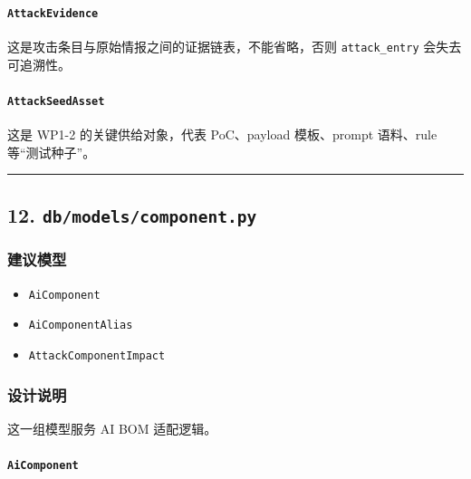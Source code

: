 \documentclass[UTF8]{ctexart}
\providecommand{\tightlist}{%
  \setlength{\itemsep}{0pt}\setlength{\parskip}{0pt}}
\begin{document}
\hypertarget{attackevidence}{%
\paragraph{\texorpdfstring{\texttt{AttackEvidence}}{AttackEvidence}}\label{attackevidence}}

这是攻击条目与原始情报之间的证据链表，不能省略，否则
\texttt{attack\_entry} 会失去可追溯性。

\hypertarget{attackseedasset}{%
\paragraph{\texorpdfstring{\texttt{AttackSeedAsset}}{AttackSeedAsset}}\label{attackseedasset}}

这是 WP1-2 的关键供给对象，代表 PoC、payload 模板、prompt 语料、rule
等``测试种子''。

\begin{center}\rule{0.5\linewidth}{0.5pt}\end{center}

\hypertarget{dbmodelscomponent.py}{%
\subsection{\texorpdfstring{12.
\texttt{db/models/component.py}}{12. db/models/component.py}}\label{dbmodelscomponent.py}}

\hypertarget{ux5efaux8baeux6a21ux578b-2}{%
\subsubsection{建议模型}\label{ux5efaux8baeux6a21ux578b-2}}

\begin{itemize}
\tightlist
\item
  \texttt{AiComponent}
\item
  \texttt{AiComponentAlias}
\item
  \texttt{AttackComponentImpact}
\end{itemize}

\hypertarget{ux8bbeux8ba1ux8bf4ux660e-1}{%
\subsubsection{设计说明}\label{ux8bbeux8ba1ux8bf4ux660e-1}}

这一组模型服务 AI BOM 适配逻辑。

\hypertarget{aicomponent}{%
\paragraph{\texorpdfstring{\texttt{AiComponent}}{AiComponent}}\label{aicomponent}}
\end{document}
